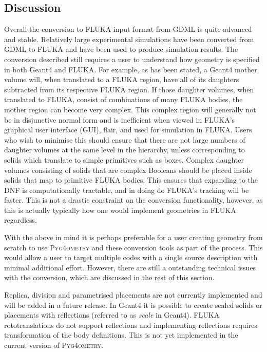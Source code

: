 \documentclass[final,5p,times,twocolumn]{elsarticle}
\newcommand{\PYGEOMETRY}{\textsc{Pyg4ometry}}
\begin{document}
\subsection{Discussion}
Overall the conversion to FLUKA input format from GDML is quite advanced
and stable. Relatively large experimental simulations have been converted
from GDML to FLUKA and have been used to produce simulation results. The
conversion described still requires a user to understand how geometry is
specified in both Geant4 and FLUKA. For example, as has been stated, a
Geant4 mother volume will, when translated to a FLUKA region, have all of
its daughters subtracted from its respective FLUKA region. If those daughter volumes, when
translated to FLUKA, consist of combinations of many FLUKA bodies, the
mother region can become very complex.  This complex
region will generally not be in disjunctive normal form and is inefficient
when viewed in FLUKA's graphical user interface (GUI), flair, and used for
simulation in FLUKA.  Users who wish to minimise this should ensure that
there are not large numbers of daughter volumes at the same level in the
hierarchy, unless corresponding to solids which translate to simple
primitives such as boxes.  Complex daughter volumes consisting of solids
that are complex Booleans should be placed inside solids that map
to primitive FLUKA bodies.  This ensures that expanding to the DNF is
computationally tractable, and in doing do FLUKA's tracking will be faster.
This is not a drastic constraint on the conversion functionality, however,
as this is actually typically how one would implement geometries in FLUKA
regardless.

With the above in mind it is perhaps preferable for a user creating
geometry from scratch to use \PYGEOMETRY{} and these conversion tools
as part of the process.  This would allow a user to target multiple codes with
a single source description with minimal additional effort.  However, there
are still a  outstanding technical issues with the conversion, which are
discussed in the rest of this section.

Replica, division and parametrised placements are not currently implemented
and will be added in a future release. In Geant4 it is possible to create scaled
solids or placements with reflections (referred to as \emph{scale} in Geant4). FLUKA
rototranslations do not support reflections and implementing reflections
requires transformation of the body definitions. This is not yet implemented
in the current version of \PYGEOMETRY{}.
\end{document}
